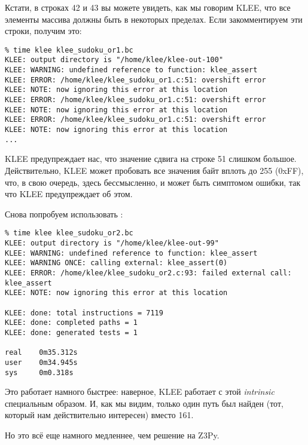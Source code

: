 Кстати, в строках 42 и 43 вы можете увидеть, как мы говорим KLEE, что все элементы массива должны быть в некоторых
пределах.
Если закомментируем эти строки, получим это:

\begin{lstlisting}
% time klee klee_sudoku_or1.bc
KLEE: output directory is "/home/klee/klee-out-100"
KLEE: WARNING: undefined reference to function: klee_assert
KLEE: ERROR: /home/klee/klee_sudoku_or1.c:51: overshift error
KLEE: NOTE: now ignoring this error at this location
KLEE: ERROR: /home/klee/klee_sudoku_or1.c:51: overshift error
KLEE: NOTE: now ignoring this error at this location
KLEE: ERROR: /home/klee/klee_sudoku_or1.c:51: overshift error
KLEE: NOTE: now ignoring this error at this location
...
\end{lstlisting}

KLEE предупреждает нас, что значение сдвига на строке 51 слишком большое.
Действительно, KLEE может пробовать все значения байт вплоть до 255 (0xFF), что, в свою очередь, здесь бессмысленно,
и может быть симптомом ошибки, так что KLEE предупреждает об этом.

Снова попробуем использовать :



\begin{lstlisting}
% time klee klee_sudoku_or2.bc
KLEE: output directory is "/home/klee/klee-out-99"
KLEE: WARNING: undefined reference to function: klee_assert
KLEE: WARNING ONCE: calling external: klee_assert(0)
KLEE: ERROR: /home/klee/klee_sudoku_or2.c:93: failed external call: klee_assert
KLEE: NOTE: now ignoring this error at this location

KLEE: done: total instructions = 7119
KLEE: done: completed paths = 1
KLEE: done: generated tests = 1

real    0m35.312s
user    0m34.945s
sys     0m0.318s
\end{lstlisting}

Это работает намного быстрее: наверное, KLEE работает с этой \textit{intrinsic} специальным образом.
И, как мы видим, только один путь был найден (тот, который нам действительно интересен) вместо 161.

Но это всё еще намного медленнее, чем решение на Z3Py.

